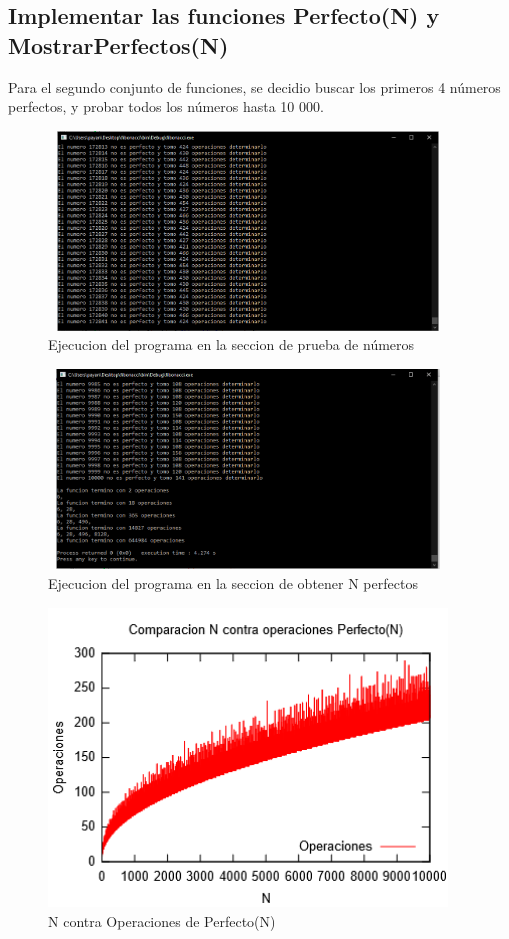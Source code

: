 \documentclass[spanish]{article}
\begin{document}
	\subsection{Implementar las funciones Perfecto(N) y MostrarPerfectos(N)}
	Para el segundo conjunto de funciones, se decidio buscar los primeros 4 números perfectos, y probar todos los números hasta 10 000.
	\begin{figure}[H]
		\centering
		\includegraphics[width=400px,height=200px]{ejecucionSegundaParte}
		\caption{Ejecucion del programa en la seccion de prueba de números}
	\end{figure}
	\begin{figure}[H]
		\centering
		\includegraphics[width=400px,height=200px]{ejecucionTerceraParte}
		\caption{Ejecucion del programa en la seccion de obtener N perfectos}
	\end{figure}
	\begin{figure}[h!]
		\centering
		\includegraphics[width=400px,height=300px]{grafica5}
		\caption{N contra Operaciones de Perfecto(N)}
	\end{figure}
\end{document}
